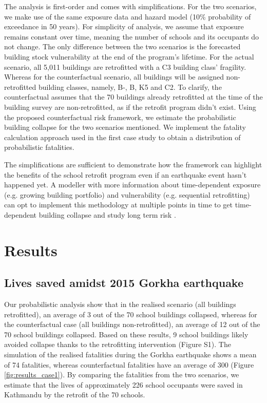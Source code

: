 \documentclass[utf8]{frontiersSCNS} %
\begin{document}
The analysis is first-order and comes with simplifications. For the two scenarios, we make use of the same exposure data and hazard model (10\% probability of exceedance in 50 years). For simplicity of analysis, we assume that exposure remains constant over time, meaning the number of schools and its occupants do not change. The only difference between the two scenarios is the forecasted building stock vulnerability at the end of the program's lifetime. For the actual scenario, all 5,011 buildings are retrofitted with a C3 building class' fragility. Whereas for the counterfactual scenario, all buildings will be assigned non-retrofitted building classes, namely, B-, B, K5 and C2. To clarify, the counterfactual assumes that the 70 buildings already retrofitted at the time of the building survey are non-retrofitted, as if the retrofit program didn't exist. Using the proposed counterfactual risk framework, we estimate the probabilistic building collapse for the two scenarios mentioned. We implement the fatality calculation approach used in the first case study to obtain a distribution of probabilistic fatalities.

The simplifications are sufficient to demonstrate how the framework can highlight the benefits of the school retrofit program even if an earthquake event hasn't happened yet. A modeller with more information about time-dependent exposure (e.g. growing building portfolio) and vulnerability (e.g. sequential retrofitting) can opt to implement this methodology at multiple points in time to get time-dependent building collapse and study long term risk \citep{rabonza2019accounting}. 

\section{Results}
\label{section-results}

\subsection{Lives saved amidst 2015 Gorkha earthquake}

Our probabilistic analysis show that in the realised scenario (all buildings retrofitted), an average of 3 out of the 70 school buildings collapsed, whereas for the counterfactual case (all buildings non-retrofitted), an average of 12 out of the 70 school buildings collapsed. Based on these results, 9 school buildings likely avoided collapse thanks to the retrofitting intervention (Figure S1). The simulation of the realised fatalities during the Gorkha earthquake shows a mean of 74 fatalities, whereas counterfactual fatalities have an average of 300 (Figure \ref{fig:results_case1}). By comparing the fatalities from the two scenarios, we estimate that the lives of approximately 226 school occupants were saved in Kathmandu by the retrofit of the 70 schools.
\end{document}
